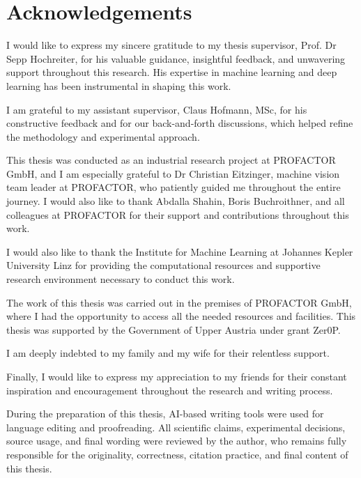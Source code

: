\cleardoubleoddpage
\chapter*{Acknowledgements}
\label{chap:acknowledgements}

I would like to express my sincere gratitude to my thesis supervisor, Prof. Dr Sepp Hochreiter, for his valuable guidance, insightful feedback, and unwavering support throughout this research. His expertise in machine learning and deep learning has been instrumental in shaping this work.

I am grateful to my assistant supervisor, Claus Hofmann, MSc, for his constructive feedback and for our back-and-forth discussions, which helped refine the methodology and experimental approach.

This thesis was conducted as an industrial research project at PROFACTOR GmbH, and I am especially grateful to Dr Christian Eitzinger, machine vision team leader at PROFACTOR, who patiently guided me throughout the entire journey. I would also like to thank Abdalla Shahin, Boris Buchroithner, and all colleagues at PROFACTOR for their support and contributions throughout this work.

I would also like to thank the Institute for Machine Learning at Johannes Kepler University Linz for providing the computational resources and supportive research environment necessary to conduct this work.

The work of this thesis was carried out in the premises of PROFACTOR GmbH, where I had the opportunity to access all the needed resources and facilities. This thesis was supported by the Government of Upper Austria under grant Zer0P.

I am deeply indebted to my family and my wife for their relentless support.

Finally, I would like to express my appreciation to my friends for their constant inspiration and encouragement throughout the research and writing process.

\par\medskip
During the preparation of this thesis, AI-based writing tools were used for language editing and proofreading. All scientific claims, experimental decisions, source usage, and final wording were reviewed by the author, who remains fully responsible for the originality, correctness, citation practice, and final content of this thesis.
